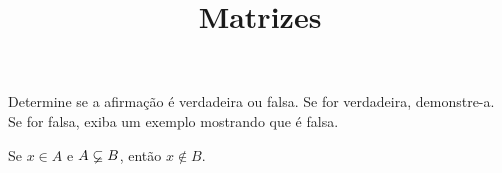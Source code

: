 \documentclass{beamer}
\title{Matrizes}
\author[\autor]{\autor}
\date{}
\begin{document}
    \begin{frame}
        \maketitle
    \end{frame}


    \begin{frame}
        \begin{exercicio}
            Determine se a afirma\c{c}\~ao \'e verdadeira ou falsa. Se for verdadeira, demonstre-a. Se for falsa, exiba um
            exemplo mostrando que \'e falsa.
            \begin{center}
                Se $x \in A$ e $A \varsubsetneq B$, ent\~ao $x \notin B$.
            \end{center}
        \end{exercicio}

        \vspace{6cm}
    \end{frame}
\end{document}
